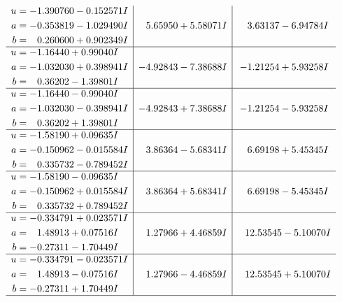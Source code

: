 \documentclass[1p]{elsarticle_modified}
\theoremstyle{definition}
\begin{document}
$$\begin{array}{c|c|c}
\begin{aligned}
u &= -1.390760 - 0.152571 I \\
a &= -0.353819 - 1.029490 I \\
b &= \phantom{-}0.260600 + 0.902349 I\end{aligned}
 & \phantom{-}5.65950 + 5.58071 I & \phantom{-}3.63137 - 6.94784 I \\ \hline\begin{aligned}
u &= -1.16440 + 0.99040 I \\
a &= -1.032030 + 0.398941 I \\
b &= \phantom{-}0.36202 - 1.39801 I\end{aligned}
 & -4.92843 - 7.38688 I & -1.21254 + 5.93258 I \\ \hline\begin{aligned}
u &= -1.16440 - 0.99040 I \\
a &= -1.032030 - 0.398941 I \\
b &= \phantom{-}0.36202 + 1.39801 I\end{aligned}
 & -4.92843 + 7.38688 I & -1.21254 - 5.93258 I \\ \hline\begin{aligned}
u &= -1.58190 + 0.09635 I \\
a &= -0.150962 - 0.015584 I \\
b &= \phantom{-}0.335732 - 0.789452 I\end{aligned}
 & \phantom{-}3.86364 - 5.68341 I & \phantom{-}6.69198 + 5.45345 I \\ \hline\begin{aligned}
u &= -1.58190 - 0.09635 I \\
a &= -0.150962 + 0.015584 I \\
b &= \phantom{-}0.335732 + 0.789452 I\end{aligned}
 & \phantom{-}3.86364 + 5.68341 I & \phantom{-}6.69198 - 5.45345 I \\ \hline\begin{aligned}
u &= -0.334791 + 0.023571 I \\
a &= \phantom{-}1.48913 + 0.07516 I \\
b &= -0.27311 - 1.70449 I\end{aligned}
 & \phantom{-}1.27966 + 4.46859 I & \phantom{-}12.53545 - 5.10070 I \\ \hline\begin{aligned}
u &= -0.334791 - 0.023571 I \\
a &= \phantom{-}1.48913 - 0.07516 I \\
b &= -0.27311 + 1.70449 I\end{aligned}
 & \phantom{-}1.27966 - 4.46859 I & \phantom{-}12.53545 + 5.10070 I\\
 \hline 
 \end{array}$$\newpage\newpage\renewcommand{\arraystretch}{1}
\end{document}

